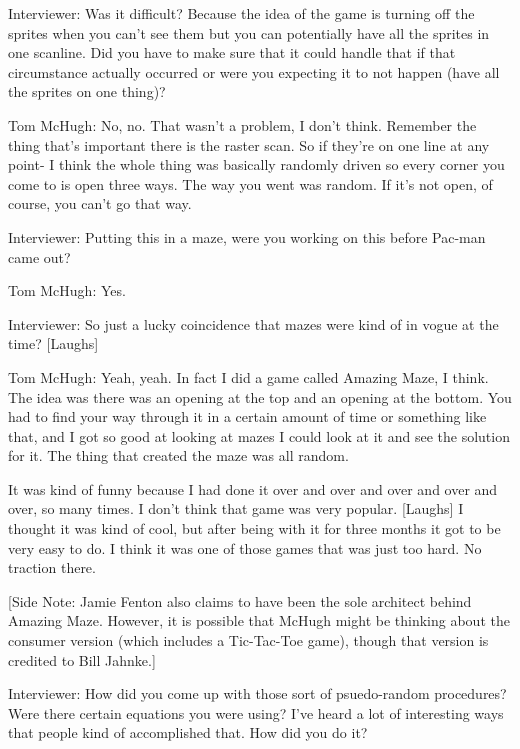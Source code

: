 \textcolor{interviewer}{Interviewer:} Was it difficult? Because the idea of the game is turning off the sprites when you can’t see them but you can potentially have all the sprites in one scanline. Did you have to make sure that it could handle that if that circumstance actually occurred or were you expecting it to not happen (have all the sprites on one thing)?

\textcolor{interviewee}{Tom McHugh:} No, no. That wasn’t a problem, I don’t think. Remember the thing that’s important there is the raster scan. So if they’re on one line at any point- I think the whole thing was basically randomly driven so every corner you come to is open three ways. The way you went was random. If it’s not open, of course, you can’t go that way.

\textcolor{interviewer}{Interviewer:} Putting this in a maze, were you working on this before Pac-man came out?

\textcolor{interviewee}{Tom McHugh:} Yes.

\textcolor{interviewer}{Interviewer:} So just a lucky coincidence that mazes were kind of in vogue at the time? [Laughs]

\textcolor{interviewee}{Tom McHugh:} Yeah, yeah. In fact I did a game called Amazing Maze, I think. The idea was there was an opening at the top and an opening at the bottom. You had to find your way through it in a certain amount of time or something like that, and I got so good at looking at mazes I could look at it and see the solution for it. The thing that created the maze was all random. 

It was kind of funny because I had done it over and over and over and over and over, so many times. I don’t think that game was very popular. [Laughs] I thought it was kind of cool, but after being with it for three months it got to be very easy to do. I think it was one of those games that was just too hard. No traction there.

[Side Note: Jamie Fenton also claims to have been the sole architect behind Amazing Maze. However, it is possible that McHugh might be thinking about the consumer version (which includes a Tic-Tac-Toe game), though that version is credited to Bill Jahnke.]

\textcolor{interviewer}{Interviewer:} How did you come up with those sort of psuedo-random procedures? Were there certain equations you were using? I’ve heard a lot of interesting ways that people kind of accomplished that. How did you do it?

